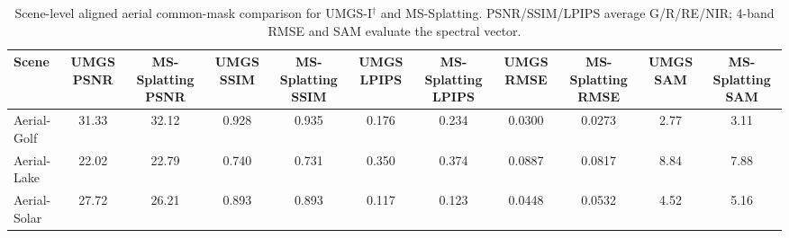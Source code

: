 ﻿\begin{table}[!t]
    \caption{Scene-level aligned aerial common-mask comparison for UMGS-I$^\dagger$ and MS-Splatting. PSNR/SSIM/LPIPS average G/R/RE/NIR; 4-band RMSE and SAM evaluate the spectral vector.}
    \label{tab:mms-scenes}
    \centering
    \scriptsize
    \setlength{\tabcolsep}{3pt}
    \begin{tabular}{lcccccccccc}
        \toprule
        Scene & UMGS PSNR & MS-Splatting PSNR & UMGS SSIM & MS-Splatting SSIM & UMGS LPIPS & MS-Splatting LPIPS & UMGS RMSE & MS-Splatting RMSE & UMGS SAM & MS-Splatting SAM \\
        \midrule
        Aerial-Golf & 31.33 & 32.12 & 0.928 & 0.935 & 0.176 & 0.234 & 0.0300 & 0.0273 & 2.77 & 3.11 \\
        Aerial-Lake & 22.02 & 22.79 & 0.740 & 0.731 & 0.350 & 0.374 & 0.0887 & 0.0817 & 8.84 & 7.88 \\
        Aerial-Solar & 27.72 & 26.21 & 0.893 & 0.893 & 0.117 & 0.123 & 0.0448 & 0.0532 & 4.52 & 5.16 \\
        \bottomrule
    \end{tabular}
\end{table}

